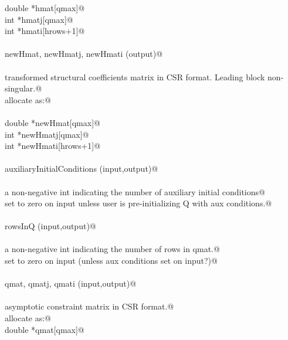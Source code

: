 \documentclass[12pt]{article}
\begin{document}
\begin{flushleft}
\begin{minipage}{\linewidth}
\begin{list}{}{}
\mbox{}\verb@                        double *hmat[qmax]@\\
\mbox{}\verb@                        int *hmatj[qmax]@\\
\mbox{}\verb@                        int *hmati[hrows+1]@\\
\mbox{}\verb@@\\
\mbox{}\verb@        newHmat, newHmatj, newHmati (output)@\\
\mbox{}\verb@@\\
\mbox{}\verb@                transformed structural coefficients matrix in CSR format. Leading block non-singular.@\\
\mbox{}\verb@                allocate as:@\\
\mbox{}\verb@@\\
\mbox{}\verb@                        double *newHmat[qmax]@\\
\mbox{}\verb@                        int *newHmatj[qmax]@\\
\mbox{}\verb@                        int *newHmati[hrows+1]@\\
\mbox{}\verb@@\\
\mbox{}\verb@        auxiliaryInitialConditions (input,output)@\\
\mbox{}\verb@@\\
\mbox{}\verb@                a non-negative int indicating the number of auxiliary initial conditions@\\
\mbox{}\verb@                set to zero on input unless user is pre-initializing Q with aux conditions.@\\
\mbox{}\verb@@\\
\mbox{}\verb@        rowsInQ (input,output)@\\
\mbox{}\verb@@\\
\mbox{}\verb@                a non-negative int indicating the number of rows in qmat.@\\
\mbox{}\verb@                set to zero on input (unless aux conditions set on input?)@\\
\mbox{}\verb@@\\
\mbox{}\verb@        qmat, qmatj, qmati (input,output)@\\
\mbox{}\verb@@\\
\mbox{}\verb@                asymptotic constraint matrix in CSR format.@\\
\mbox{}\verb@                allocate as:@\\
\mbox{}\verb@                        double *qmat[qmax]@\\

\end{list}
\end{minipage}
\end{flushleft}
\end{document}
